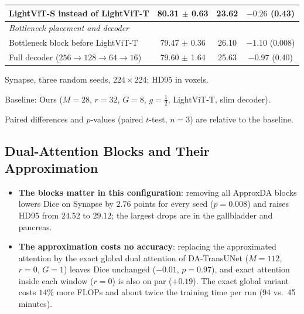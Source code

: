 \begin{table}[t]
{\begin{tabular}{lccc}
\quad LightViT-S instead of LightViT-T & 80.31 $\pm$ 0.63 & 23.62 & $-0.26$ (0.43) \\
\midrule
\multicolumn{4}{l}{\textit{Bottleneck placement and decoder}} \\
\quad Bottleneck block before LightViT-T & 79.47 $\pm$ 0.36 & 26.10 & $\mathbf{-1.10}$ (0.008) \\
\quad Full decoder ($256 \to 128 \to 64 \to 16$) & 79.60 $\pm$ 1.64 & 25.63 & $-0.97$ (0.40) \\
\bottomrule
\end{tabular}
}
\begin{tablenotes}
\item Synapse, three random seeds, $224 \times 224$; HD95 in voxels.
\item Baseline: Ours ($M=28$, $r=32$, $G=8$, $g=\frac{1}{2}$, LightViT-T, slim decoder).
\item Paired differences and $p$-values (paired $t$-test, $n = 3$) are relative to the baseline.
\end{tablenotes}
\end{table}

\subsection{Dual-Attention Blocks and Their Approximation}
\begin{itemize}
    \item \textbf{The blocks matter in this configuration}: removing all ApproxDA blocks lowers Dice on Synapse by $2.76$ points for every seed ($p = 0.008$) and raises HD95 from $24.52$ to $29.12$; the largest drops are in the gallbladder and pancreas.
    \item \textbf{The approximation costs no accuracy}: replacing the approximated attention by the exact global dual attention of DA-TransUNet ($M=112$, $r=0$, $G=1$) leaves Dice unchanged ($-0.01$, $p = 0.97$), and exact attention inside each window ($r=0$) is also on par ($+0.19$). The exact global variant costs $14\%$ more FLOPs and about twice the training time per run (94 vs.\ 45 minutes).
\end{itemize}

